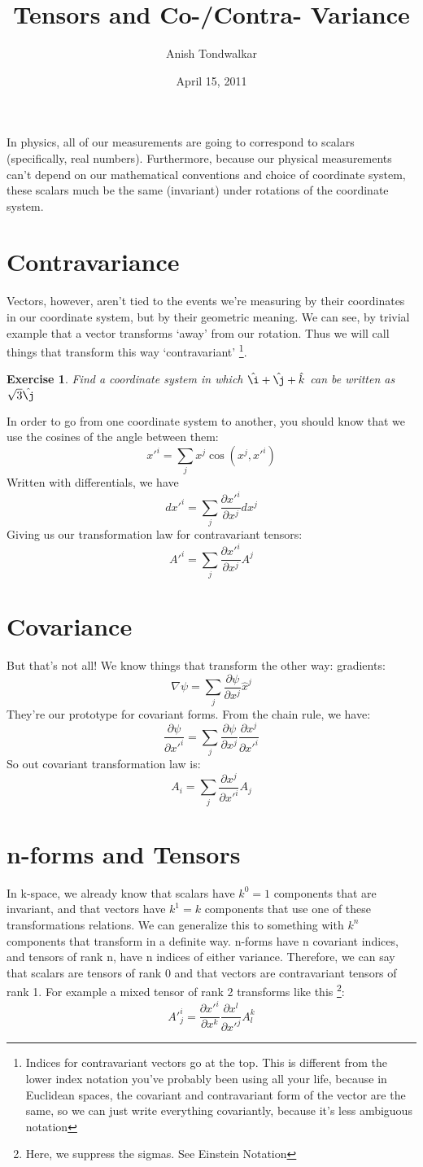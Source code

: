 \documentclass[11pt,notitlepage]{article}
\title{Tensors and Co-/Contra- Variance}
\author{Anish Tondwalkar}
\date{April 15, 2011}
\newtheorem{exc}{Exercise}[section]
\begin{document}
\maketitle
In physics, all of our measurements are going to correspond to scalars (specifically, real numbers). 
Furthermore, because our physical measurements can't depend on our mathematical conventions and choice of coordinate system,
these scalars much be the same (invariant) under rotations of the coordinate system.
\section{Contravariance}
Vectors, however, aren't tied to the events we're measuring by their coordinates in our coordinate system, but by their geometric meaning.
We can see, by trivial example that a vector transforms `away' from our rotation. 
Thus we will call things that transform this way `contravariant'
\footnote{Indices for contravariant vectors go at the top. This is different from the lower index notation you've probably been using all your life, because in Euclidean spaces, the covariant and contravariant form of the vector are the same, so we can just write everything covariantly, because it's less ambiguous notation}. 
\begin{exc}
Find a coordinate system in which
$\hat\i + \hat\j + \hat k$
 can be written as $\sqrt3 \hat\j$
\end{exc}
In order to go from one coordinate system to another, you should know that we use the cosines of the angle between them:
$$ x'^i = \sum_j x^j \cos(x^j,x'^i) $$
Written with differentials, we have
$$ dx'^i = \sum_j \frac{\partial x'^i}{\partial x^j} dx^j $$
Giving us our transformation law for contravariant tensors:
$$ A'^i = \sum_j \frac{\partial x'^i}{\partial x^j} A^j $$
\section{Covariance}
But that's not all! We know things that transform the other way: gradients:
$$ \nabla \psi = \sum_j \frac{\partial \psi}{\partial x^j} \hat x^j $$
 They're our prototype for covariant forms. 
From the chain rule, we have: 
$$\frac{\partial \psi}{\partial x'^i} = \sum_j \frac{\partial \psi}{\partial x^j} \frac{\partial x^j}{\partial x'^i} $$
So out covariant transformation law is:
$$ A_i = \sum_j \frac{\partial x^j}{\partial x'^i} A_j$$

\section{n-forms and Tensors}
In k-space, we already know that scalars have $k^0=1$ components that are invariant, and that vectors have $k^1=k$ components that use one of these transformations relations. We can generalize this to something with $k^n$ components that transform in a definite way. n-forms have n covariant indices, and tensors of rank n, have n indices of either variance. Therefore, we can say that scalars are tensors of rank 0 and that vectors are contravariant tensors of rank 1. For example a mixed tensor of rank 2 transforms like this \footnote{Here, we suppress the sigmas. See Einstein Notation}:
$$A'^i_j =  \frac{\partial x'^i}{\partial x^k}\frac{\partial x^l}{\partial x'^j} A^k_l $$
\end{document}
